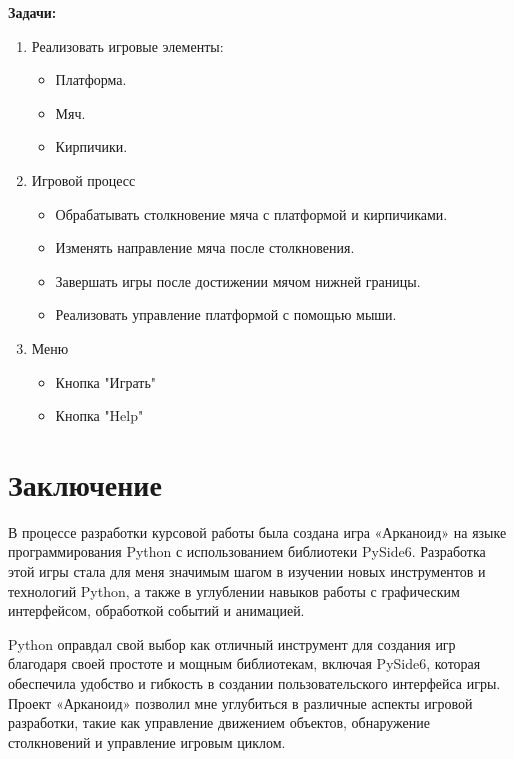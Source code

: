 \documentclass[14pt, oneside]{altsu-report}
\begin{document}
\textbf{Задачи:}
\begin{enumerate}
\item Реализовать игровые элементы:
\begin{itemize}
    \item Платформа.
    \item Мяч.
    \item Кирпичики.
\end{itemize}
\item Игровой процесс
\begin{itemize}
    \item Обрабатывать столкновение мяча с платформой и кирпичиками.
    \item Изменять направление мяча после столкновения.
    \item Завершать игры после достижении мячом нижней границы.
    \item Реализовать управление платформой с помощью мыши.
\end{itemize}
\item Меню
\begin{itemize}
    \item Кнопка "Играть"
    \item Кнопка "Help"
\end{itemize}
\end{enumerate}





\chapter*{Заключение}

В процессе разработки курсовой работы была создана игра «Арканоид» на языке программирования Python с использованием библиотеки PySide6. Разработка этой игры стала для меня значимым шагом в изучении новых инструментов и технологий Python, а также в углублении навыков работы с графическим интерфейсом, обработкой событий и анимацией.

Python оправдал свой выбор как отличный инструмент для создания игр благодаря своей простоте и мощным библиотекам, включая PySide6, которая обеспечила удобство и гибкость в создании пользовательского интерфейса игры. Проект «Арканоид» позволил мне углубиться в различные аспекты игровой разработки, такие как управление движением объектов, обнаружение столкновений и управление игровым циклом.
\end{document}
